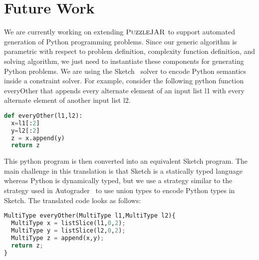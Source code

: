 \section{Future Work}

We are currently working on extending $\textsc{PuzzleJAR}$ to support
automated generation of Python programming problems. Since our generic
algorithm is parametric with respect to problem definition, complexity
function definition, and solving algorithm, we just need to
instantiate these components for generating Python problems. We are
using the Sketch~\cite{sketchjournal,sketch06} solver to encode Python
semantics inside a constraint solver. For example, consider the
following python function everyOther that appends every alternate
element of an input list l1 with every alternate element of another
input list l2.

\singlespace
\begin{lstlisting}[language=Python, frame=single]
def everyOther(l1,l2):
  x=l1[:2]
  y=l2[:2]
  z = x.append(y)
  return z

\end{lstlisting}




\doublespace

This python program is then converted into an equivalent Sketch
program. The main challenge in this translation is that Sketch is a
statically typed language whereas Python is dynamically typed, but we
use a strategy similar to the strategy used in
Autograder~\cite{autograder} to use union types to encode Python types
in Sketch. The translated code looks as follows:

\singlespace
\begin{lstlisting}[language=Python, frame=single]
MultiType everyOther(MultiType l1,MultiType l2){
  MultiType x = listSlice(l1,0,2);
  MultiType y = listSlice(l2,0,2);
  MultiType z = append(x,y);
  return z;
}
\end{lstlisting}
\doublespace

